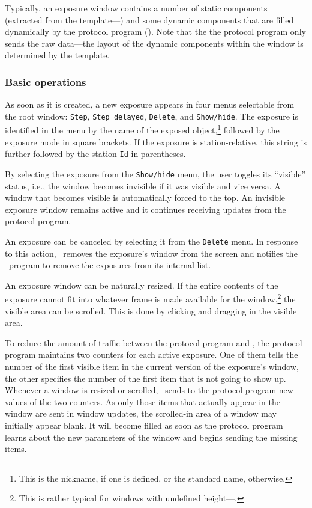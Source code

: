 Typically, an exposure window contains a number of static components
(extracted from the template---) and some
dynamic components that are
filled dynamically by the protocol program ().
Note that the the protocol program only sends the raw data---the layout of the
dynamic components within the window is determined by the template.

\subsubsection{Basic operations}
\label{rm_ds_wm_gc}

As soon as it is created, a new exposure appears in four menus selectable
from the root window: {\tt Step}, {\tt Step~delayed}, {\tt Delete},
and {\tt Show/hide}.
The exposure is identified in the menu by the name of the exposed
object,\footnote{This is the nickname, if one is defined, or
the standard name, otherwise.}
followed by the exposure mode in square brackets.
If the exposure is station-relative, this string is further followed by
the station {\tt Id} in parentheses.

By selecting the exposure from the {\tt Show/hide} menu, the user
toggles its ``visible'' status, i.e., the window becomes invisible if it
was visible and vice versa.
A window that becomes visible is automatically forced to the top.
An invisible exposure window remains active and it continues receiving
updates from the protocol program.

An exposure can be canceled by selecting it from the {\tt Delete} menu.
In response to this action, \dsd\ removes the exposure's window from the
screen and notifies the \smurph\ program to remove the exposures from its
internal list.

An exposure window can be naturally resized.
If the entire contents of the exposure cannot fit into whatever frame
is made available for the window,\footnote{This is rather typical for
windows with undefined height---.}
the visible area can be scrolled.
This is done by clicking and dragging in the visible area.

To reduce the amount of traffic between the protocol program and \dsd,
the protocol program maintains two counters for each active exposure.
One of them tells the number of the first visible item in the current
version of the exposure's window, the other specifies the number of the
first item that is not going to show up.
Whenever a window is resized or scrolled, \dsd\ sends to the protocol
program new values of the two counters.
As only those items that actually appear in the window are sent in
window updates,
the scrolled-in area of a window may initially appear blank.
It will become filled as soon as the protocol program learns about the
new parameters of the window and begins sending the missing items.

